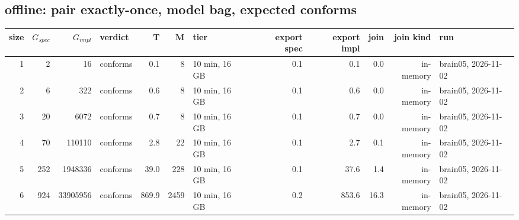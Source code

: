 \documentclass[10pt]{article}
\begin{document}
\subsection*{offline: pair \textsf{exactly-once}, model bag, expected conforms}
\begin{longtable}{@{}rrrlrrlrrrrl@{}}
\toprule
size & $G_{\mathit{spec}}$ & $G_{\mathit{impl}}$ & verdict & T & M & tier & export spec & export impl & join & join kind & run \\
\midrule
\endhead
\color{red} 1 & 2 & 16 & conforms & 0.1 & 8 & 10 min, 16 GB & 0.1 & 0.1 & 0.0 & in-memory & brain05, 2026-11-02 \\
\color{red} 2 & 6 & 322 & conforms & 0.6 & 8 & 10 min, 16 GB & 0.1 & 0.6 & 0.0 & in-memory & brain05, 2026-11-02 \\
\color{red} 3 & 20 & 6072 & conforms & 0.7 & 8 & 10 min, 16 GB & 0.1 & 0.7 & 0.0 & in-memory & brain05, 2026-11-02 \\
\color{red} 4 & 70 & 110110 & conforms & 2.8 & 22 & 10 min, 16 GB & 0.1 & 2.7 & 0.1 & in-memory & brain05, 2026-11-02 \\
\color{red} 5 & 252 & 1948336 & conforms & 39.0 & 228 & 10 min, 16 GB & 0.1 & 37.6 & 1.4 & in-memory & brain05, 2026-11-02 \\
\color{red} 6 & 924 & 33905956 & conforms & 869.9 & 2459 & 10 min, 16 GB & 0.2 & 853.6 & 16.3 & in-memory & brain05, 2026-11-02 \\
\bottomrule
\end{longtable}
\end{document}
